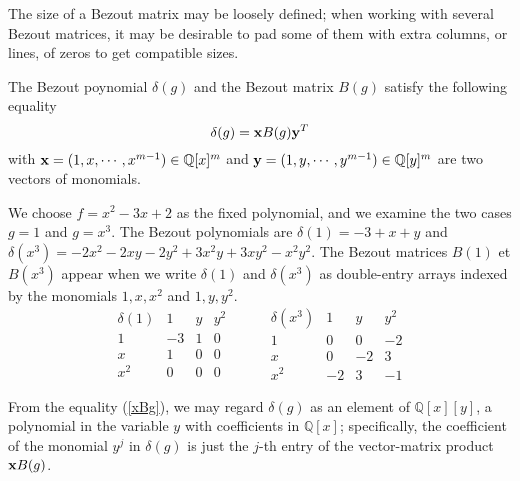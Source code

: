 \documentclass{standalone}
\begin{document}
\begin{rem}
The size of a Bezout matrix may be loosely defined; when working with several Bezout matrices, it may be desirable to pad some of them with extra columns, or lines, of zeros to get compatible sizes.
\end{rem}
\begin{rem}
The Bezout poynomial $\delta(g)$ and the Bezout matrix $B(g)$ satisfy the following equality
\begin{equation}
	\label{xBg}
	\delta(g) = \bold{x} B(g) \bold{y}^T
\end{equation}
with $\bold{x} = (1, x,\cdots, x^{m-1}) \in \mathbb{Q}[x]^m$ and $\bold{y} = (1, y,\cdots, y^{m-1}) \in \mathbb{Q}[y]^m$ are two vectors of monomials.
\end{rem}

\begin{exmp}
\label{exmp_1}
We choose $f = x^2 - 3x + 2$ as the fixed polynomial, and we examine the two cases $g=1$ and $g = x^3$. 
The Bezout polynomials are $\delta(1) = -3 + x + y$ and $\delta(x^3) = -2x^2 - 2xy -2y^2 + 3x^2y + 3xy^2 -x^2y^2$. 
The Bezout matrices $B(1)$ et $B(x^3)$ appear when we write  $\delta(1)$ and  $\delta(x^3)$ as double-entry arrays indexed by the monomials $1, x, x^2$ and $1, y, y^2$.
$$
\begin{array}{c|ccc}
\delta(1) & 1 & y & y^2\\
\hline
1 & -3 & 1 & 0\\
x & 1 & 0 & 0\\
x^2 & 0 & 0 & 0
\end{array}
\hspace{1cm}
\begin{array}{c|ccc}
\delta(x^3) & 1 & y & y^2\\
\hline
1 & 0 & 0 & -2\\
x & 0 & -2 & 3\\
x^2 & -2 & 3 & -1
\end{array}
$$
\end{exmp}

From the equality (\ref{xBg}), we may regard $\delta(g)$ as an element of $\mathbb{Q}[x][y]$, a polynomial in the variable $y$ with coefficients in $\mathbb{Q}[x]$; 
specifically, the coefficient of the monomial $y^j$ in $\delta(g)$ is just the $j$-th entry of the vector-matrix product $\bold{x} B(g)$.
\end{document}
